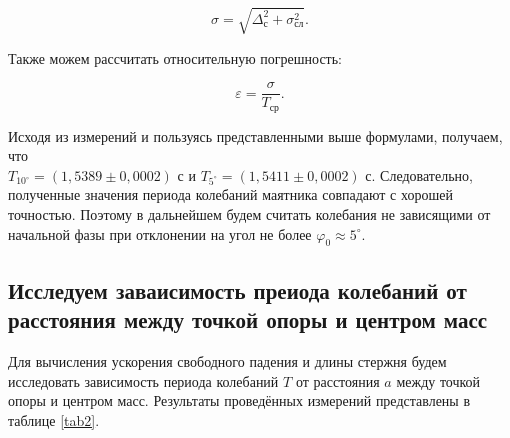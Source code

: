 \documentclass[a4paper,12pt]{article} %
\begin{document}
\begin{equation}
\sigma = \sqrt{\Delta_\text{с}^2+\sigma_\text{сл}^2}.
\end{equation}

Также можем рассчитать относительную погрешность:

\begin{equation}
\varepsilon = \frac{\sigma}{T_\text{ср}}.
\end{equation}

Исходя из измерений и пользуясь представленными выше формулами, получаем, что\\ $  T_{10^\circ} =\left( 1,5389 \pm 0,0002\right)  $ с и $ T_{5^\circ} =\left(  1,5411 \pm 0,0002\right)  $ с. Следовательно, полученные значения периода колебаний маятника совпадают с хорошей точностью. Поэтому в дальнейшем будем считать колебания не зависящими от начальной фазы при отклонении на угол не более $ \varphi_0 \approx 5^\circ$.

\subsection{Исследуем заваисимость преиода колебаний от расстояния между точкой опоры и центром масс}

Для вычисления ускорения свободного падения и длины стержня будем исследовать зависимость периода колебаний $ T $ от расстояния $ a $ между точкой опоры и центром масс. Результаты проведённых измерений представлены в таблице \ref{tab2}.
\end{document}
